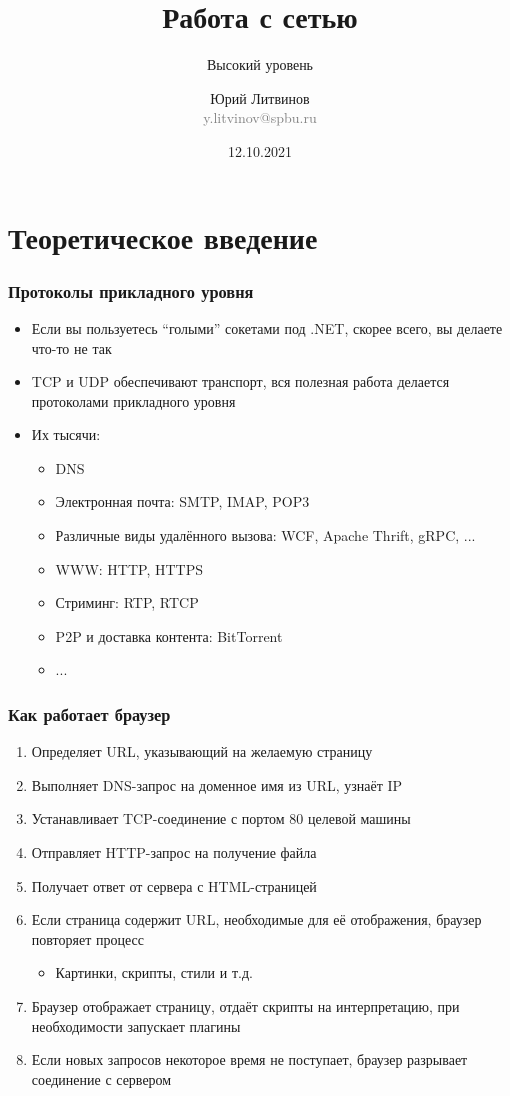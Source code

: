 \documentclass[xetex,mathserif,serif]{beamer}
\title{Работа с сетью}
\subtitle{Высокий уровень}
\author[Юрий Литвинов]{Юрий Литвинов\\\small{\textcolor{gray}{y.litvinov@spbu.ru}}}
\date{12.10.2021}
\begin{document}
    \frame{\titlepage}

    \section{Теоретическое введение}

    \begin{frame}
        \frametitle{Протоколы прикладного уровня}
        \begin{itemize}
            \item Если вы пользуетесь ``голыми'' сокетами под .NET, скорее всего, вы делаете что-то не так
            \item TCP и UDP обеспечивают транспорт, вся полезная работа делается протоколами прикладного уровня
            \item Их тысячи:
            \begin{itemize}
                \item DNS
                \item Электронная почта: SMTP, IMAP, POP3
                \item Различные виды удалённого вызова: WCF, Apache Thrift, gRPC, ...
                \item WWW: HTTP, HTTPS
                \item Стриминг: RTP, RTCP
                \item P2P и доставка контента: BitTorrent
                \item ...
            \end{itemize}
        \end{itemize}
    \end{frame}

    \begin{frame}
        \frametitle{Как работает браузер}
        \begin{enumerate}
            \item Определяет URL, указывающий на желаемую страницу
            \item Выполняет DNS-запрос на доменное имя из URL, узнаёт IP
            \item Устанавливает TCP-соединение с портом 80 целевой машины
            \item Отправляет HTTP-запрос на получение файла
            \item Получает ответ от сервера с HTML-страницей
            \item Если страница содержит URL, необходимые для её отображения, браузер повторяет процесс
            \begin{itemize}
                \item Картинки, скрипты, стили и т.д.
            \end{itemize}
            \item Браузер отображает страницу, отдаёт скрипты на интерпретацию, при необходимости запускает плагины
            \item Если новых запросов некоторое время не поступает, браузер разрывает соединение с сервером
        \end{enumerate}
    \end{frame}
\end{document}
